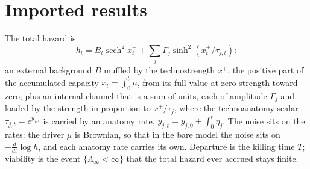 \section{Imported results}\label{sec:imports}

\begin{definition}\label{imp:model}
The total hazard is
\[
h_t=B_t\operatorname{sech}^2x_t^++\sum_j\Gamma_j\sinh^2(x_t^+/\tau_{j,t}):
\]
an external background $B$ muffled by the technostrength $x^+$, the
positive part of the accumulated capacity $x_t=\int_0^t\mu$, from its full
value at zero strength toward zero, plus an internal channel that is a
sum of units, each of amplitude $\Gamma_j$ and loaded by the strength in
proportion to $x^+/\tau_j$, where the technoanatomy scalar
$\tau_{j,t}=e^{y_{j,t}}$ is carried by an anatomy rate,
$y_{j,t}=y_{j,0}+\int_0^t\eta_j$. The noise sits on the rates: the driver
$\mu$ is Brownian, so that in the bare model the noise sits on
$-\frac{d}{dt}\log h$, and each anatomy rate carries its own. Departure is
the killing time $T$; viability is the event $\{\Lambda_\infty<\infty\}$
that the total hazard ever accrued stays finite.
\end{definition}

